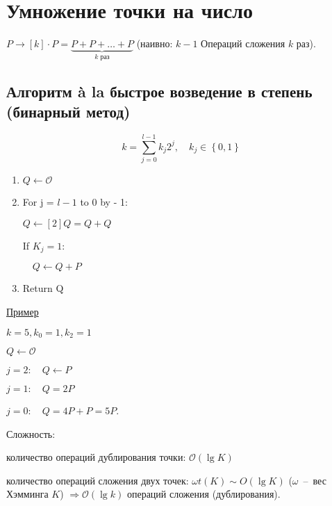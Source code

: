 \documentclass[12pt]{article}
\newcommand{\bigO}{\mathcal{O}}
\theoremstyle{definition}
\theoremstyle{definition}
\theoremstyle{definition}
\begin{document}
\section{Умножение точки на число}
    $P \to \left[ k \right] \cdot P = \underbrace {P + P +  \ldots  + P}_{k{\text{ раз}}}$ (наивно: $k-1$ Операций сложения $k$ раз).
    
    \subsection{Алгоритм à la быстрое возведение в степень (бинарный метод)}
    $$k = \sum\limits_{j = 0}^{l - 1} {{k_j}{2^j}} ,\quad {k_j} \in \left\{ {0,1} \right\}
    $$
    
    \begin{enumerate}
    	\item $Q \leftarrow \mathcal{O}$
    	
    	\item For j = $l - 1$ to 0 by - 1:
    	
    	$Q \leftarrow \left[ 2 \right]Q = Q + Q$
    	
    	If ${K_j} = 1:$
    	
    	$\quad Q \leftarrow Q + P$
    	
    	\item Return Q
    \end{enumerate}
    
    \underline{Пример}
    
    $k = 5, k_0 = 1, k_2 = 1$
    
    $Q \leftarrow \mathcal{O}$
    
    $j = 2: \quad Q \leftarrow P$
    
    $j = 1: \quad Q = 2P$
    
    $j = 0: \quad Q = 4P + P = 5P$.
    
    Сложность: 
    
    количество операций дублирования точки: $\bigO(\lg K)$
    
    количество операций сложения двух точек: $\omega t(K)\sim O (\lg K)$ ($\omega$~--~вес Хэмминга $K$) $ \Rightarrow \bigO \left( {\lg k} \right)$ операций сложения (дублирования).
\end{document}
